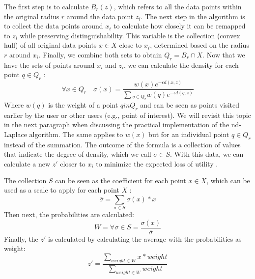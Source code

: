 The first step is to calculate $B_r(z)$, which refers to all the data points within the original radius $r$ around the data point $z_i$.
The next step in the algorithm is to collect the data points around $x_i$ to calculate how closely it can be remapped to $z_i$ while preserving distinguishability.
This variable is the collection (convex hull) of all original data points $x \in X$ close to $x_i$, determined based on the radius $r$ around $x_i$.
Finally, we combine both sets to obtain $Q_r = B_r \cap X$.
Now that we have the sets of points around $x_i$ and $z_i$, we can calculate the density for each point $q \in Q_r$ \citep{chatzikokolakis_efficient_2017}:
\begin{equation}
  \forall x \in Q_r \quad \sigma(x) = \frac{w(x)e^{-\epsilon d(x, z)}}{\sum{_{q\in Q_r} w(q)e^{-\epsilon d(q, z)}}}
  \label{eq:optimal-remapping-formula-1}
\end{equation}
Where $w(q)$ is the weight of a point $q in Q_r$ and can be seen as points visited earlier by the user or other users (e.g., point of interest).
We will revisit this topic in the next paragraph when discussing the practical implementation of the nd-Laplace algorithm.
The same applies to $w(x)$ but for an individual point $q \in Q_r$ instead of the summation.
The outcome of the formula is a collection of values that indicate the degree of density, which we call $\sigma \in S$.
With this data, we can calculate a new $z'$ closer to $x_i$ to minimize the expected loss of utility \citep{chatzikokolakis_efficient_2017}.

The collection $S$ can be seen as the coefficient for each point $x \in X$, which can be used as a scale to apply for each point $X$ \citep{chatzikokolakis_efficient_2017}:
\begin{equation}
  \bar{\sigma} = \sum_{\sigma \in S} \sigma(x) * x
  \label{eq:optimal-remapping-formula-2}
\end{equation}
Then next, the probabilities are calculated:
\begin{equation}
  W = \forall \sigma \in S = \frac{\sigma(x)}{\bar{\sigma}}
  \label{eq:optimal-remapping-formula-3}
\end{equation}
Finally, the $z'$ is calculated by calculating the average with the probabilities as weight:
\begin{equation}
  z' = \frac{\sum_{weight \in W} x * weight }{\sum_{weight \in W} weight}
  \label{eq:optimal-remapping-formula-4}
\end{equation}

